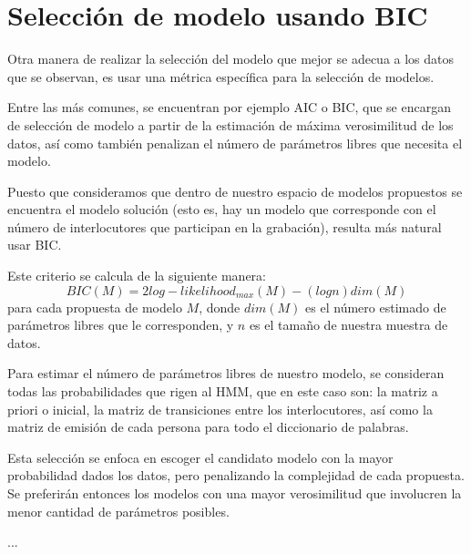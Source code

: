 \section{Selección de modelo usando BIC}

\begin{comment} 
Una vez que se tienen los parámetros estimados para cada uno de los modelos correspondientes a las propuestas, se necesita ver cuál es el modelo que mejor se ajusta a los datos.
\end{comment} 

Otra manera de realizar la selección del modelo que mejor se adecua a los datos que se observan, es usar una métrica específica para la selección de modelos.

Entre las más comunes, se encuentran por ejemplo \ac{AIC} o \ac{BIC}, que se encargan de selección de modelo a partir de la estimación de máxima verosimilitud de los datos, así como también penalizan el número de parámetros libres que necesita el modelo.

Puesto que consideramos que dentro de nuestro espacio de modelos propuestos se encuentra el modelo solución (esto es, hay un modelo que corresponde con el número de interlocutores que participan en la grabación), resulta más natural usar \ac{BIC}.

Este criterio se calcula de la siguiente manera: 
\begin{equation}
BIC(M) = 2 log-likelihood_{max}(M) - (log n ) dim(M)
\end{equation}
para cada propuesta de modelo $M$, donde $dim(M)$ es el número estimado de parámetros libres que le corresponden, y $n$ es el tamaño de nuestra muestra de datos.

Para estimar el número de parámetros libres de nuestro modelo, se consideran todas las probabilidades que rigen al \ac{HMM}, que en este caso son: la matriz a priori o inicial, la matriz de transiciones entre los interlocutores, así como la matriz de emisión de cada persona para todo el diccionario de palabras.

Esta selección se enfoca en escoger el candidato modelo con la mayor probabilidad dados los datos, pero penalizando la complejidad de cada propuesta. Se preferirán entonces los modelos con una mayor verosimilitud que involucren la menor cantidad de parámetros posibles. 

...